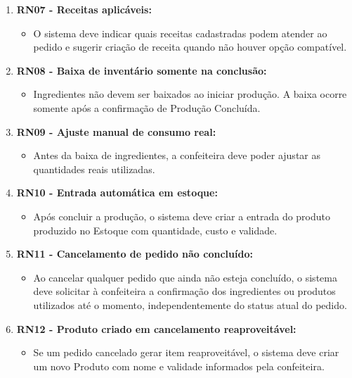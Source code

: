 \begin{enumerate}
   
    \item \textbf{RN07 - Receitas aplicáveis:}
    \begin{itemize}
        \item O sistema deve indicar quais receitas cadastradas podem atender ao pedido e sugerir criação de receita quando não houver opção compatível.
    \end{itemize}


    \item \textbf{RN08 -  Baixa de inventário somente na conclusão:}
    \begin{itemize}
        \item Ingredientes não devem ser baixados ao iniciar produção. A baixa ocorre somente após a confirmação de Produção Concluída. 
    \end{itemize}

    \item \textbf{RN09 -  Ajuste manual de consumo real:}
    \begin{itemize}
        \item Antes da baixa de ingredientes, a confeiteira deve poder ajustar as quantidades reais utilizadas.
    \end{itemize}

    \item \textbf{RN10 -  Entrada automática em estoque:}
    \begin{itemize}
        \item Após concluir a produção, o sistema deve criar a entrada do produto produzido no Estoque com quantidade, custo e validade.
    \end{itemize}

    \item \textbf{RN11 -  Cancelamento de pedido não concluído:}
    \begin{itemize}
        \item Ao cancelar qualquer pedido que ainda não esteja concluído, o sistema deve solicitar à confeiteira a confirmação dos ingredientes ou produtos utilizados até o momento, independentemente do status atual do pedido. 
    \end{itemize}

    \item \textbf{RN12 -  Produto criado em cancelamento reaproveitável:}
    \begin{itemize}
        \item Se um pedido cancelado gerar item reaproveitável, o sistema deve criar um novo Produto com nome e validade informados pela confeiteira. 
    \end{itemize}


\end{enumerate}
